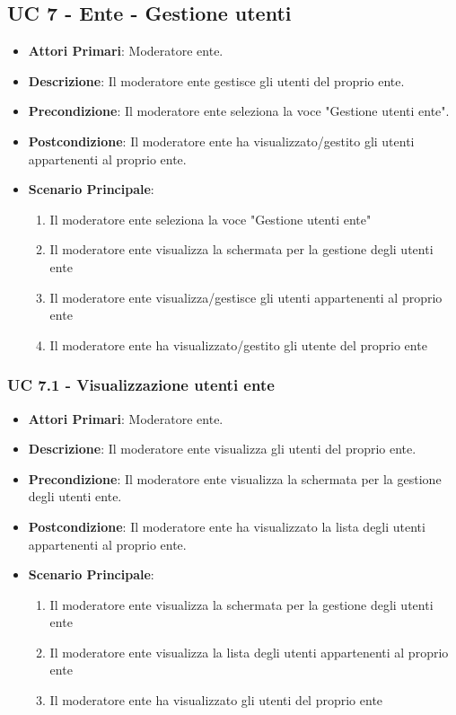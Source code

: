	\subsection{UC 7 - Ente - Gestione utenti}
		
		\begin{itemize}
			\item \textbf{Attori Primari}: Moderatore ente.
			\item \textbf{Descrizione}: Il moderatore ente gestisce gli utenti del proprio ente.
			\item \textbf{Precondizione}: Il moderatore ente seleziona la voce "Gestione utenti ente".
			\item \textbf{Postcondizione}: Il moderatore ente ha visualizzato/gestito gli utenti appartenenti al proprio ente.
			\item \textbf{Scenario Principale}:
			\begin{enumerate}
				\item{Il moderatore ente seleziona la voce "Gestione utenti ente"}
				\item{Il moderatore ente visualizza la schermata per la gestione degli utenti ente}
				\item{Il moderatore ente visualizza/gestisce gli utenti appartenenti al proprio ente}
				\item{Il moderatore ente ha visualizzato/gestito gli utente del proprio ente}
			\end{enumerate}	
		\end{itemize}
			
			\subsubsection{UC 7.1 - Visualizzazione utenti ente}
			\begin{itemize}
				\item \textbf{Attori Primari}: Moderatore ente.
				\item \textbf{Descrizione}: Il moderatore ente visualizza gli utenti del proprio ente.
				\item \textbf{Precondizione}: Il moderatore ente visualizza la schermata per la gestione degli utenti ente.
				\item \textbf{Postcondizione}: Il moderatore ente ha visualizzato la lista degli utenti appartenenti al proprio ente.
				\item \textbf{Scenario Principale}:
				\begin{enumerate}
					\item{Il moderatore ente visualizza la schermata per la gestione degli utenti ente}
					\item{Il moderatore ente visualizza la lista degli utenti appartenenti al proprio ente}
					\item{Il moderatore ente ha visualizzato gli utenti del proprio ente}
				\end{enumerate}	
			\end{itemize}
			
